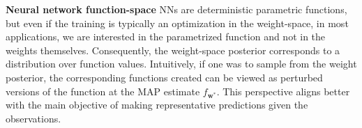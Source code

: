 \documentclass{article}
\newcommand{\mbf}[1]{\mathbf{#1}}
\newcommand{\vw}{\mbf{w}}
\begin{document}
\textbf{Neural network function-space} %
NNs are deterministic parametric functions, but even if the training is typically an optimization in the weight-space, in most applications, we are interested in the parametrized function and not in the weights themselves.
Consequently, the weight-space posterior corresponds to a distribution over function values.
Intuitively, if one was to sample from the weight posterior, the corresponding functions created can be viewed as perturbed versions of the function at the MAP estimate $f_{\vw^*}$. This perspective aligns better with the main objective of making representative predictions given the observations.
\end{document}
